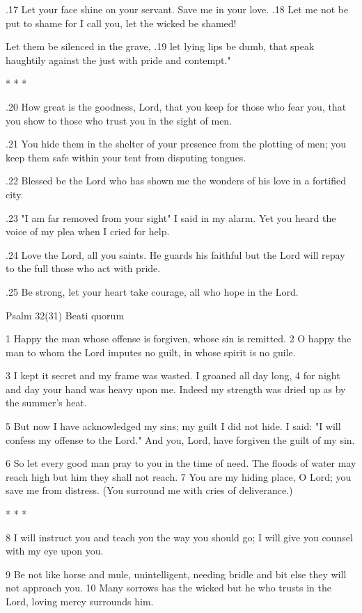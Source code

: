 .17 Let your face shine on your servant.
Save me in your love.
.18 Let me not be put to shame for I call you,
let the wicked be shamed!

Let them be silenced in the grave,
.19 let lying lips be dumb,
that speak haughtily against the just
with pride and contempt."

* * *

.20 How great is the goodness, Lord,
that you keep for those who fear you,
that you show to those who trust you
in the sight of men.

.21 You hide them in the shelter of your presence
from the plotting of men;
you keep them safe within your tent
from disputing tongues.

.22 Blessed be the Lord who has shown me
the wonders of his love
in a fortified city.

.23 "I am far removed from your sight"
I said in my alarm.
Yet you heard the voice of my plea
when I cried for help.

.24 Love the Lord, all you saints.
He guards his faithful
but the Lord will repay to the full
those who act with pride.

.25 Be strong, let your heart take courage,
all who hope in the Lord.


Psalm 32(31) Beati quorum

1 Happy the man whose offense is forgiven,
whose sin is remitted.
2 O happy the man to whom the Lord
imputes no guilt,
in whose spirit is no guile.

3 I kept it secret and my frame was wasted.
I groaned all day long,
4 for night and day your hand was heavy upon me.
Indeed my strength was dried up
as by the summer's heat.

5 But now I have acknowledged my sins;
my guilt I did not hide.
I said: "I will confess
my offense to the Lord."
And you, Lord, have forgiven
the guilt of my sin.

6 So let every good man pray to you
in the time of need.
The floods of water may reach high
but him they shall not reach.
7 You are my hiding place, O Lord;
you save me from distress.
(You surround me with cries of deliverance.)

* * *

8 I will instruct you and teach you
the way you should go;
I will give you counsel
with my eye upon you.

9 Be not like horse and mule, unintelligent,
needing bridle and bit
else they will not approach you.
10 Many sorrows has the wicked
but he who trusts in the Lord,
loving mercy surrounds him.

